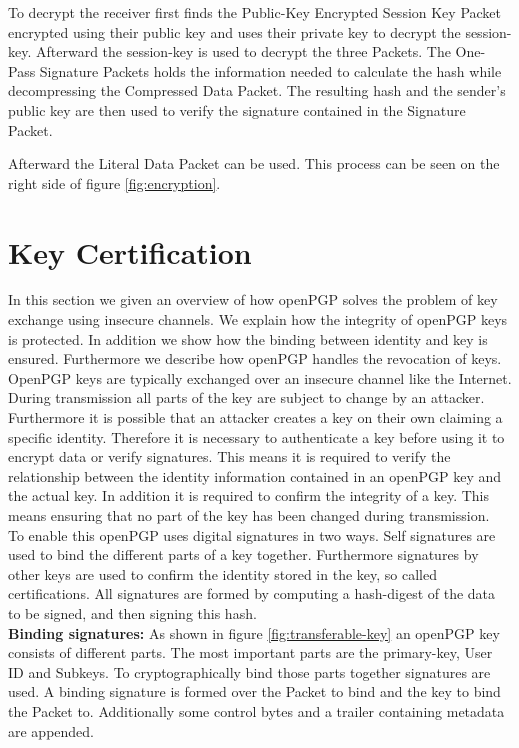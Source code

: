 To decrypt the receiver first finds the Public-Key Encrypted Session Key Packet encrypted using their public key and uses their private key to decrypt the session-key. Afterward the session-key is used to decrypt the three Packets. The One-Pass Signature Packets holds the information needed to calculate the hash while decompressing the Compressed Data Packet. The resulting hash and the sender's public key are then used to verify the signature contained in the Signature Packet. 

Afterward the Literal Data Packet can be used. This process can be seen on the right side of figure \ref{fig:encryption}.

\section{Key Certification}
\label{section:messageformat:cert}

In this section we given an overview of how openPGP solves the problem of key exchange using insecure channels. We explain how the integrity of openPGP keys is protected. In addition we show how the binding between identity and key is ensured. Furthermore we describe how openPGP handles the revocation of keys. \\

OpenPGP keys are typically exchanged over an insecure channel like the Internet. During transmission all parts of the key are subject to change by an attacker. Furthermore it is possible that an attacker creates a key on their own claiming a specific identity. Therefore it is necessary to authenticate a key before using it to encrypt data or verify signatures.
This means it is required to verify the relationship between the identity information contained in an openPGP key and the actual key. In addition it is required to confirm the integrity of a key. This means ensuring that no part of the key has been changed during transmission. \\

To enable this openPGP uses digital signatures in two ways. Self signatures are used to bind the different parts of a key together. Furthermore signatures by other keys are used to confirm the identity stored in the key, so called certifications. All signatures are formed by computing a hash-digest of the data to be signed, and then signing this hash. \\

\textbf{Binding signatures:} As shown in figure \ref{fig:transferable-key} an openPGP key consists of different parts. The most important parts are the primary-key, User ID  and Subkeys. To cryptographically bind those parts together signatures are used. A binding signature is formed over the Packet to bind and the key to bind the Packet to. Additionally some control bytes and a trailer containing metadata are appended.  \\

